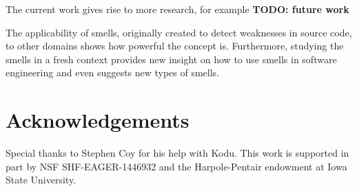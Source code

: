 \documentclass{sig-alternate}
\newcommand{\todo}[1]{\textbf{TODO: #1}}
\begin{document}
The current work gives rise to more research, for example \todo{future work}

The applicability of smells, originally created to detect weaknesses in source code, to other domains shows how powerful the concept is. Furthermore, studying the smells in a fresh context provides new insight on how to use smells in software engineering and even suggests new types of smells. 

\balance

\section*{Acknowledgements}
Special thanks to Stephen Coy for his help with Kodu. This work is supported in part by  NSF SHF-EAGER-1446932 and the Harpole-Pentair endowment at Iowa State University.




\end{document}
